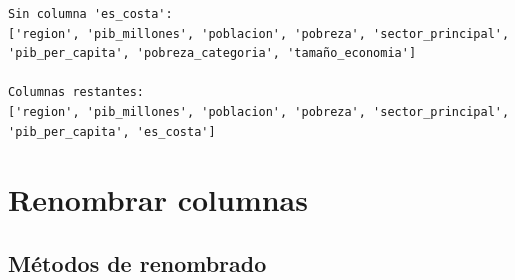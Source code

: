 \documentclass[
  doc,
  floatsintext,
  longtable,
  a4paper,
  nolmodern,
  notxfonts,
  notimes,
  12pt,
  colorlinks=true,linkcolor=blue,citecolor=blue,urlcolor=blue]{apa7}
\begin{document}
\begin{verbatim}
Sin columna 'es_costa':
['region', 'pib_millones', 'poblacion', 'pobreza', 'sector_principal', 'pib_per_capita', 'pobreza_categoria', 'tamaño_economia']

Columnas restantes:
['region', 'pib_millones', 'poblacion', 'pobreza', 'sector_principal', 'pib_per_capita', 'es_costa']
\end{verbatim}

\section{Renombrar columnas}\label{renombrar-columnas}

\subsection{Métodos de renombrado}\label{muxe9todos-de-renombrado}
\end{document}
